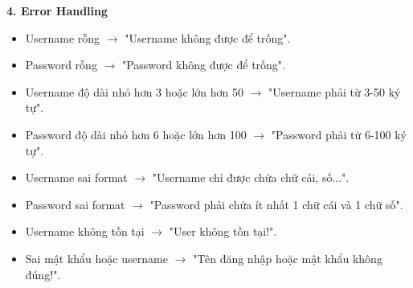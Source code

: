 \documentclass[a4paper,12pt]{article}
\begin{document}
\textbf{4. Error Handling}
\begin{itemize}
    \item Username rỗng $\rightarrow$ "Username không được để trống".
    \item Password rỗng $\rightarrow$ "Password không được để trống".
    \item Username độ dài nhỏ hơn 3 hoặc lớn hơn 50 $\rightarrow$ "Username phải từ 3-50 ký tự".
    \item Password độ dài nhỏ hơn 6 hoặc lớn hơn 100 $\rightarrow$ "Password phải từ 6-100 ký tự".
    \item Username sai format $\rightarrow$ "Username chỉ được chứa chữ cái, số...".
    \item Password sai format $\rightarrow$ "Password phải chứa ít nhất 1 chữ cái và 1 chữ số".
    \item Username không tồn tại $\rightarrow$ "User không tồn tại!".
    \item Sai mật khẩu hoặc username $\rightarrow$ "Tên đăng nhập hoặc mật khẩu không đúng!".
\end{itemize}
\end{document}
